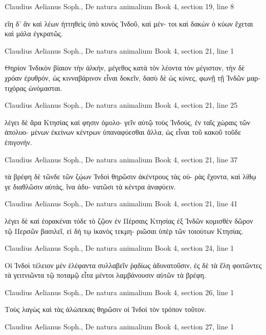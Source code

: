 \documentclass[12pt,letterpaper,twoside,final]{memoir}
\begin{document}
\begin{greek}
Claudius Aelianus Soph., De natura animalium 
Book 4, section 19, line 8

                                                εἴη δ' 
ἂν καὶ λέων ἡττηθεὶς ὑπὸ κυνὸς Ἰνδοῦ, καὶ μέν-
τοι καὶ δακὼν ὁ κύων ἔχεται καὶ μάλα ἐγκρατῶς. 



Claudius Aelianus Soph., De natura animalium 
Book 4, section 21, line 1

Θηρίον Ἰνδικὸν βίαιον τὴν ἀλκήν, μέγεθος κατὰ 
τὸν λέοντα τὸν μέγιστον, τὴν δὲ χρόαν ἐρυθρόν, ὡς 
κινναβάρινον εἶναι δοκεῖν, δασὺ δὲ ὡς κύνες, φωνῇ 
τῇ Ἰνδῶν μαρτιχόρας ὠνόμασται. 



Claudius Aelianus Soph., De natura animalium 
Book 4, section 21, line 25

                λέγει δὲ ἄρα Κτησίας καί φησιν ὁμολο-
γεῖν αὐτῷ τοὺς Ἰνδούς, ἐν ταῖς χώραις τῶν ἀπολυο-
μένων ἐκείνων κέντρων ὑπαναφύεσθαι ἄλλα, ὡς εἶναι 
τοῦ κακοῦ τοῦδε ἐπιγονήν. 



Claudius Aelianus Soph., De natura animalium 
Book 4, section 21, line 37

                                           τὰ βρέφη δὲ 
τῶνδε τῶν ζῴων Ἰνδοὶ θηρῶσιν ἀκέντρους τὰς οὐ-
ρὰς ἔχοντα, καὶ λίθῳ γε διαθλῶσιν αὐτάς, ἵνα ἀδυ-  
νατῶσι τὰ κέντρα ἀναφύειν. 



Claudius Aelianus Soph., De natura animalium 
Book 4, section 21, line 41

                                 λέγει δὲ καὶ ἑορακέναι 
τόδε τὸ ζῷον ἐν Πέρσαις Κτησίας ἐξ Ἰνδῶν κομισθὲν 
δῶρον τῷ Περσῶν βασιλεῖ, εἰ δή τῳ ἱκανὸς τεκμη-
ριῶσαι ὑπὲρ τῶν τοιούτων Κτησίας. 



Claudius Aelianus Soph., De natura animalium 
Book 4, section 24, line 1

Οἱ Ἰνδοὶ τέλειον μὲν ἐλέφαντα συλλαβεῖν ῥᾳδίως 
ἀδυνατοῦσιν, ἐς δὲ τὰ ἕλη φοιτῶντες τὰ γειτνιῶντα 
τῷ ποταμῷ εἶτα μέντοι λαμβάνουσιν αὐτῶν τὰ βρέφη. 



Claudius Aelianus Soph., De natura animalium 
Book 4, section 26, line 1

Τοὺς λαγὼς καὶ τὰς ἀλώπεκας θηρῶσιν οἱ Ἰνδοὶ 
τὸν τρόπον τοῦτον. 



Claudius Aelianus Soph., De natura animalium 
Book 4, section 27, line 1


\end{greek}
\end{document}
